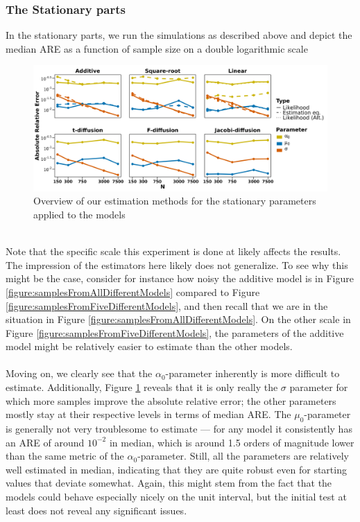 \subsubsection{The Stationary parts}
In the stationary parts, we run the simulations as described above and depict the median ARE as a function of sample size on a double logarithmic scale
\begin{figure}[h]
    \begin{center}
    \includegraphics[scale = .1]{figures/parameter_precision_stationary.jpeg}
    \caption{Overview of our estimation methods for the stationary parameters applied to the models}
    \label{figure:overviewOfEstimatorsStationary}
    \end{center}
\end{figure}\\
Note that the specific scale this experiment is done at likely affects the results. The impression of the estimators here likely does not generalize. To see why this might be the case, consider for instance how noisy the additive model is in Figure \ref{figure:samplesFromAllDifferentModels} compared to Figure \ref{figure:samplesFromFiveDifferentModels}, and then recall that we are in the situation in Figure \ref{figure:samplesFromAllDifferentModels}. On the other scale in Figure \ref{figure:samplesFromFiveDifferentModels}, the parameters of the additive model might be relatively easier to estimate than the other models.\\\\
Moving on, we clearly see that the $\alpha_0$-parameter inherently is more difficult to estimate. Additionally, Figure \ref{figure:overviewOfEstimatorsStationary} reveals that it is only really the $\sigma$ parameter for which more samples improve the absolute relative error; the other parameters mostly stay at their respective levels in terms of median ARE. The $\mu_0$-parameter is generally not very troublesome to estimate — for any model it consistently has an ARE of around $10^{-2}$ in median, which is around 1.5 orders of magnitude lower than the same metric of the $\alpha_0$-parameter. Still, all the parameters are relatively well estimated in median, indicating that they are quite robust even for starting values that deviate somewhat. Again, this might stem from the fact that the models could behave especially nicely on the unit interval, but the initial test at least does not reveal any significant issues.

